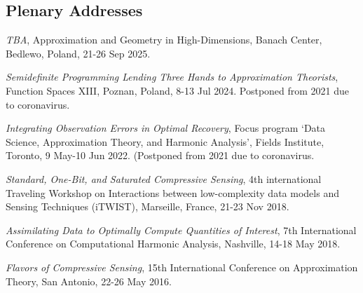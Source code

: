 \documentclass[11pt]{article}
\begin{document}
\subsection{Plenary Addresses}
\bitemize
\item {\sl TBA}, Approximation and Geometry in High-Dimensions, Banach Center, Bedlewo, Poland,
21-26 Sep 2025.
\item {\sl Semidefinite Programming Lending Three Hands to Approximation Theorists}, Function Spaces XIII, Poznan, Poland,  8-13 Jul 2024.
{\small Postponed  from 2021 due to coronavirus.} %
\item {\sl Integrating Observation Errors in Optimal Recovery}, Focus program `Data Science, Approximation Theory, and Harmonic Analysis', Fields Institute, Toronto,  9 May-10 Jun 2022.
{\small (Postponed from 2021 due to coronavirus.} %
\item {\sl Standard, One-Bit, and Saturated Compressive Sensing}, 4th international Traveling Workshop on Interactions between low-complexity data models and Sensing Techniques (iTWIST),
Marseille, France, 21-23 Nov 2018.
\item {\sl Assimilating Data to Optimally Compute Quantities of Interest}, 7th International Conference on Computational Harmonic Analysis,
Nashville, 14-18 May 2018.
\item {\sl Flavors of Compressive Sensing}, 
15th International Conference on Approximation Theory, San Antonio, 22-26 May 2016.
\eitemize
\end{document}

